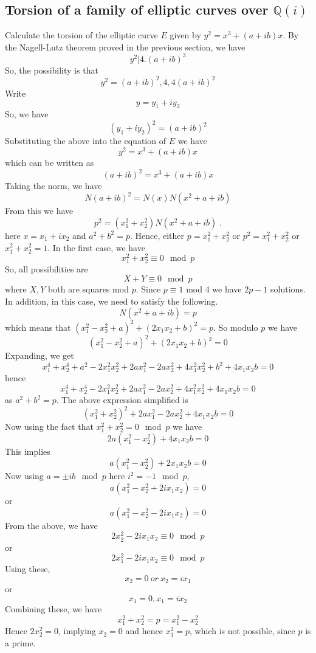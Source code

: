 \documentclass[12pt,leqno]{amsart}
\newcommand{\<}{\langle}
\renewcommand{\>}{\rangle}
\theoremstyle{definition}
\numberwithin{equation}{section}
\begin{document}


\subsection{Torsion of a family of elliptic curves over $\mathbb Q(i)$}
 Calculate the torsion of the elliptic curve  $E$  given by $y^2=x^3+(a+ib)x$. By the Nagell-Lutz theorem proved in the previous section, we have
$$y^2|4.(a+ib)^3$$
So, the possibility is that
$$y^2=(a+ib)^2, 4, 4(a+ib)^2$$
Write
$$y=y_1+iy_2$$
So, we have 
$$(y_1+iy_2)^2=(a+ib)^2$$
Substituting the above into the equation of $E$ we have
$$y^2=x^3+(a+ib)x$$
which can be written as
$$(a+ib)^2=x^3+(a+ib)x$$
Taking the norm, we have 
$$N(a+ib)^2=N(x)N(x^2+a+ib)$$
From this we have 
$$p^2=(x_1^2+x_2^2)N(x^2+a+ib)\;.$$
here $x=x_1+ix_2$ and $a^2+b^2=p$. Hence, either $p=x_1^2+x_2^2$ or $p^2=x_1^2+x_2^2$ or $x_1^2+x_2^2=1$. 
In the first case, we have 
$$x_1^2+x_2^2\equiv0 \mod p$$
So, all possibilities are 
$$X+Y\equiv0 \mod p$$
where $X,Y$ both are squares mod $p$. Since $p\equiv 1$ mod 4 we have $2p-1$ solutions. In addition, in this case, we need to satisfy the following.
$$N(x^2+a+ib)=p$$
which means that $(x_1^2-x_2^2+a)^2+(2x_1x_2+b)^2=p$. So modulo $p$ we have 
$$(x_1^2-x_2^2+a)^2+(2x_1x_2+b)^2=0$$
Expanding, we get 
$$x_1^4+x_2^4+a^2-2x_1^2x_2^2+2ax_1^2-2ax_2^2+4x_1^2x_2^2+b^2+4x_1x_2b=0$$
hence
$$x_1^4+x_2^4-2x_1^2x_2^2+2ax_1^2-2ax_2^2+4x_1^2x_2^2+4x_1x_2b=0$$
as $a^2+b^2=p$.
The above expression simplified is 
$$(x_1^2+x_2^2)^2+2ax_1^2-2ax_2^2+4x_1x_2b=0$$
Now using the fact that $x_1^2+x_2^2=0 \mod p$ we have 
$$2a(x_1^2-x_2^2)+4x_1x_2b=0$$
This implies
$$a(x_1^2-x_2^2)+2x_1x_2b=0$$
Now using $a=\pm {ib} \mod p$ here $i^2=-1 \mod p$, 
$$a(x_1^2-x_2^2+2ix_1x_2)=0$$
or $$a(x_1^2-x_2^2-2ix_1x_2)=0$$
From the above, we have
$$2x_2^2-2ix_1x_2\equiv 0 \mod p$$
or 
$$2x_1^2-2ix_1x_2\equiv 0\mod p$$
Using these,
$$x_2=0 ~or~ x_2=ix_1$$
or 
$$x_1=0, x_1=ix_2$$
Combining these, we have
$$x_1^2+x_2^2=p=x_1^2-x_2^2$$
Hence $2x_2^2=0$, implying $x_2=0$ and hence $x_1^2=p$, which is not possible, since $p$ is a prime.
\end{document}
